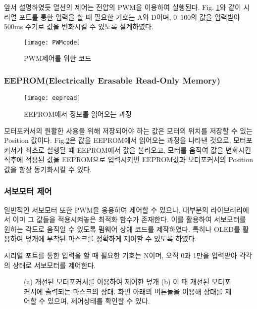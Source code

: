  앞서 설명하였듯 열선의 제어는 전압의 PWM을 이용하여 실행된다. Fig. \ref{PWM}와 같이 시리얼 포트를 통한 입력을 할 때 필요한 기호는 A와 D이며, 0~100의 값을 입력받아 500ms 주기로 값을 변화시킬 수 있도록 설계하였다.
 
  \begin{figure}[h]
 	\begin{center}
 		\texttt{[image: PWMcode]}
 	\end{center}
 	\caption{PWM제어를 위한 코드}
 	\label{PWM}
 \end{figure}
 
\subsubsection{EEPROM(Electrically Erasable Read-Only Memory)}

 \begin{figure}[h]
	\begin{center}
		\texttt{[image: eepread]}
	\end{center}
	\caption{EEPROM에서 정보를 읽어오는 과정}
	\label{eepread}
\end{figure}

 모터포커서의 원활한 사용을 위해 저장되어야 하는 값은 모터의 위치를 저장할 수 있는 Position 값이다. Fig.\ref{eepread}은 값을 EEPROM에서 읽어오는 과정을 나타낸 것으로, 모터포커서가 최초로 실행될 때 EEPROM에서 값을 불러오고, 모터를 움직여 값을 변화시킨 직후에 적용된 값을 EEPROM으로 입력시키면 EEPROM값과 모터포커서의 Position 값을 항상 동기화시킬 수 있다.
 
\subsubsection{서보모터 제어}
 일반적인 서보모터 또한 PWM을 응용하여 제어할 수 있으나, 대부분의 라이브러리에서 이미 그 값들을 적용시켜놓은 최적화 함수가 존재한다. 이를 활용하여 서보모터를 원하는 각도로 움직일 수 있도록 펌웨어 상에 코드를 제작하였다. 특히나 OLED를 활용하여 덮개에 부착된 마스크를 정확하게 제어할 수 있도록 하였다.
 
 시리얼 포트를 통한 입력을 할 때 필요한 기호는 N이며, 오직 0과 1만을 입력받아 각각의 상태로 서보모터를 제어한다.

	\begin{figure}[h]
	\begin{center}
	\end{center}
	\caption{(a) 개선된 모터포커서를 이용하여 제어한 덮개 (b) 이 때 개선된 모터포커서에 출력되는 마스크의 상태. 화면 아래의 버튼들을 이용해 상태를 제어할 수 있으며, 제어상태를 확인할 수 있다.}
\label{mask_status}


\end{figure}


